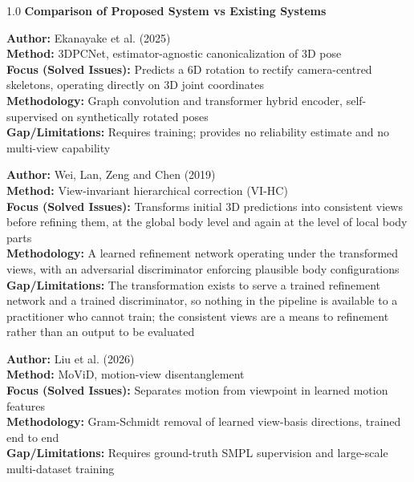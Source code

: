 \documentclass[12pt,a4paper]{report}
\begin{document}
\begin{spacing}{1.0}
\noindent \textbf{Comparison of Proposed System vs Existing Systems}

\vspace{0.18cm}

\noindent \textbf{Author:} Ekanayake et al. (2025) \\
\textbf{Method:} 3DPCNet, estimator-agnostic canonicalization of 3D pose \\
\textbf{Focus (Solved Issues):} Predicts a 6D rotation to rectify camera-centred skeletons, operating directly on 3D joint coordinates \\
\textbf{Methodology:} Graph convolution and transformer hybrid encoder, self-supervised on synthetically rotated poses \\
\textbf{Gap/Limitations:} Requires training; provides no reliability estimate and no multi-view capability

\vspace{0.18cm}

\noindent \textbf{Author:} Wei, Lan, Zeng and Chen (2019) \\
\textbf{Method:} View-invariant hierarchical correction (VI-HC) \\
\textbf{Focus (Solved Issues):} Transforms initial 3D predictions into consistent views before refining them, at the global body level and again at the level of local body parts \\
\textbf{Methodology:} A learned refinement network operating under the transformed views, with an adversarial discriminator enforcing plausible body configurations \\
\textbf{Gap/Limitations:} The transformation exists to serve a trained refinement network and a trained discriminator, so nothing in the pipeline is available to a practitioner who cannot train; the consistent views are a means to refinement rather than an output to be evaluated

\vspace{0.18cm}

\noindent \textbf{Author:} Liu et al. (2026) \\
\textbf{Method:} MoViD, motion-view disentanglement \\
\textbf{Focus (Solved Issues):} Separates motion from viewpoint in learned motion features \\
\textbf{Methodology:} Gram-Schmidt removal of learned view-basis directions, trained end to end \\
\textbf{Gap/Limitations:} Requires ground-truth SMPL supervision and large-scale multi-dataset training


\end{spacing}
\end{document}
